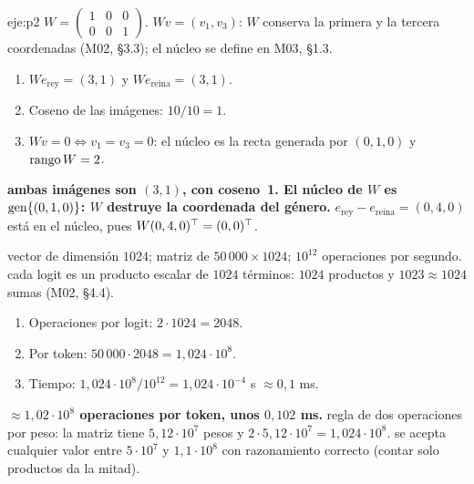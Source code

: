 \begin{solucion}{eje:p2}
\datos $W=\begin{pmatrix}1&0&0\\0&0&1\end{pmatrix}$.
\planteamiento $Wv=(v_1,v_3)$: $W$ conserva la primera y la tercera coordenadas (M02, §3.3); el núcleo se define en M03, §1.3.
\pasos
\begin{enumerate}[label=\arabic*.]
  \item $We_{\text{rey}}=(3,1)$ y $We_{\text{reina}}=(3,1)$.
  \item Coseno de las imágenes: $10/10=1$.
  \item $Wv=0\iff v_1=v_3=0$: el núcleo es la recta generada por $(0,1,0)$ y $\operatorname{rango} W=2$.
\end{enumerate}
\resultado \textbf{ambas imágenes son $(3,1)$, con coseno~1. El núcleo de $W$ es $\operatorname{gen}\{(0,1,0)\}$: $W$ destruye la coordenada del género.}
\comprobacion $e_{\text{rey}}-e_{\text{reina}}=(0,4,0)$ está en el núcleo, pues $W(0,4,0)^{\top}=(0,0)^{\top}$.

\datos vector de dimensión $1024$; matriz de $50\,000\times 1024$; $10^{12}$ operaciones por segundo.
\planteamiento cada logit es un producto escalar de $1024$ términos: $1024$ productos y $1023\approx 1024$ sumas (M02, §4.4).
\pasos
\begin{enumerate}[label=\arabic*.]
  \item Operaciones por logit: $2\cdot 1024=2048$.
  \item Por token: $50\,000\cdot 2048=1{,}024\cdot 10^{8}$.
  \item Tiempo: $1{,}024\cdot10^{8}/10^{12}=1{,}024\cdot 10^{-4}$ s $\approx 0{,}1$ ms.
\end{enumerate}
\resultado \textbf{$\approx 1{,}02\cdot 10^{8}$ operaciones por token, unos $0{,}102$ ms.}
\comprobacion regla de dos operaciones por peso: la matriz tiene $5{,}12\cdot 10^{7}$ pesos y $2\cdot 5{,}12\cdot10^{7}=1{,}024\cdot10^{8}$.
\criterio se acepta cualquier valor entre $5\cdot 10^{7}$ y $1{,}1\cdot 10^{8}$ con razonamiento correcto (contar solo productos da la mitad).

\end{solucion}

